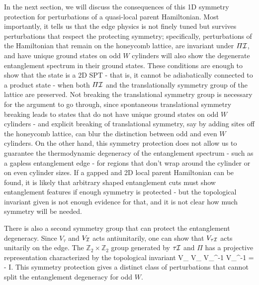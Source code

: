 In the next section, we will discuss the consequences of this 1D symmetry protection 
for perturbations of a quasi-local parent Hamiltonian. Most importantly, it tells us
that the edge physics is not finely tuned but survives perturbations that respect the
protecting symmetry; specifically, perturbations of the Hamiltonian that 
remain on the honeycomb lattice,
are invariant under $\varPi \mathcal{I}$,
and have unique ground states on odd $W$ cylinders
will also show the degenerate entanglement spectrum in their ground states.
These conditions are enough to show that the state is a 2D SPT - that is, 
it cannot be adiabatically connected to a product state - when both $\varPi \mathcal{I}$ and
the translationally symmetry group of the lattice are preserved. Not breaking the
translational symmetry group is necessary for the argument to go through, since spontaneous
translational symmetry breaking leads to states that do not have unique ground states
on odd $W$ cylinders - and explicit breaking of translational symmetry, say by adding sites
off the honeycomb lattice, can blur the distinction between odd and even $W$ cylinders.
On the other hand, this symmetry protection does not allow us to guarantee the thermodynamic
degeneracy of the entanglement spectrum - such as a gapless entanglement edge - for regions
that don't wrap around the cylinder or on even cylinder sizes. If a gapped and 2D local 
parent Hamiltonian can be found, it is likely that arbitrary shaped entanglement cuts
must show entanglement features if enough symmetry is protected - but the topological invariant 
given is not enough evidence for that, and it is not clear how much symmetry will be needed.


There is also a second symmetry group that can protect the entanglement degeneracy.
Since $V_{\tau}$ and $V_{\mathcal{I}}$ acts antiunitarily, one can show that $V_{\tau \mathcal{I}}$ acts
unitarily on the edge. The $\mathbb{Z}_2 \times \mathbb{Z}_2$ group generated by
$\tau \mathcal{I}$ and $\varPi$ has a projective representation characterized by the 
topological invariant
\beq
V_{\varPi} V_{\tau \I} V_{\varPi}^{-1} V_{\tau \I}^{-1}
 = - I.
\eeq
This symmetry protection gives a distinct class of perturbations that cannot
split the entanglement degeneracy for odd $W$.


